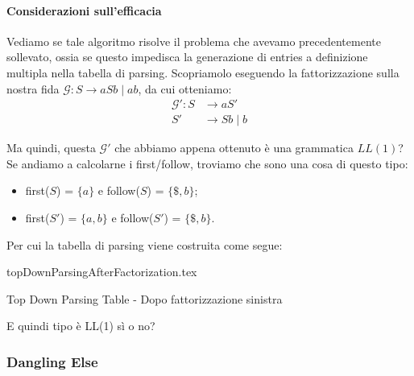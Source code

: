 \documentclass[class=book, crop=false, oneside, 12pt]{standalone}
\begin{document}
\paragraph{Considerazioni sull'efficacia}
Vediamo se tale algoritmo risolve il problema che avevamo precedentemente sollevato, ossia se questo impedisca la generazione di entries a definizione multipla nella tabella di parsing. Scopriamolo eseguendo la fattorizzazione sulla nostra fida \(\mathcal{G}: S \to aSb \mid ab\), da cui otteniamo:
\begin{align*}
    \mathcal{G}': S &\rightarrow aS' \\
    S' &\rightarrow Sb \mid b
\end{align*}

Ma quindi, questa \(\mathcal{G}'\) che abbiamo appena ottenuto è una grammatica \(LL(1)\)? Se andiamo a calcolarne i first/follow, troviamo che sono una cosa di questo tipo:
\begin{itemize}
    \item first(\(S\)) = \(\{a\}\) e follow(\(S\)) = \(\{\$, b\}\);
    \item first(\(S'\)) = \(\{a, b\}\) e follow(\(S'\)) = \(\{\$, b\}\).
\end{itemize}
Per cui la tabella di parsing viene costruita come segue:
\begin{table}[h]
    \centering
    {topDownParsingAfterFactorization.tex}
    \caption{Top Down Parsing Table - Dopo fattorizzazione sinistra}
    \label{topDownParsingAfterFactorization}
\end{table}
E quindi tipo è LL(1) sì o no?

\subsubsection{Dangling Else}
\end{document}
